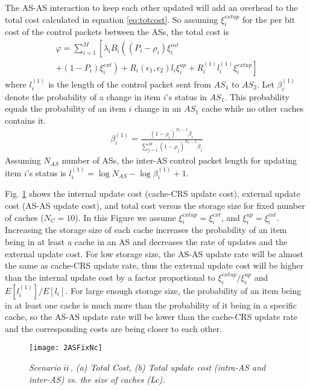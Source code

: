 \documentclass[conference]{IEEEtran}
\theoremstyle{plain}
\theoremstyle{remark}
\begin{document}
The AS-AS interaction to keep each other updated will add an overhead to the total cost calculated in equation \ref{eq:totcost}. So assuming $\xi^{extup}_i$ for the per bit cost of the control packets between the ASs, the total cost is
\begin{eqnarray}
&\varphi =\sum_{i=1}^M \left[ \lambda_i B_i \left((P_i-\rho_i) \xi^{int}_i \right. \right.& \nonumber\\ 
&+ \left. (1-P_i) \xi^{ext}_i\right) + R_i(\epsilon_1,\epsilon_2) l_i \xi^{up}_i + \left. R^{(1)}_i l^{(1)}_i \xi^{extup}_i \right]&
\end{eqnarray}
where $l^{(1)}_i$ is the length of the control packet sent from $AS_1$ to $AS_2$. Let $\beta^{(1)}_i$ denote the probability of a change in item $i$'s status in $AS_1$. This probability equals the probability of an item $i$ change in an $AS_1$ cache while no other caches contains it.
\begin{eqnarray}
\beta^{(1)}_i = \frac{(1-\rho_i)^{N_c-1}\beta_i}{\sum_{j=1}^M (1-\rho_j)^{N_c-1}\beta_j} \nonumber
\end{eqnarray}
Assuming $N_{AS}$ number of ASs, the inter-AS control packet length for updating item $i$'s status is $l^{(1)}_i = \log N_{AS}-\log \beta^{(1)}_i +1$.

Fig. \ref{fig:cost2ASvsLc} shows the internal update cost (cache-CRS update cost), external update cost (AS-AS update cost), and total cost versus the storage size for fixed number of caches ($N_C=10$). In this Figure we assume $\xi^{extup}_i=\xi^{ext}_i$, and $\xi^{up}_i=\xi^{int}_i$. Increasing the storage size of each cache increases the probability of an item being in at least a cache in an AS and decreases the rate of updates and the external update cost. For low storage size, the AS-AS update rate will be almost the same as cache-CRS update rate, thus the external update cost will be higher than the internal update cost by a factor proportional to $\xi^{extup}_i/\xi^{up}_i$ and $E[l^{(1)}_i]/E[l_i]$. For large enough storage size, the probability of an item being in at least one cache is much more than the probability of it being in a specific cache, so the AS-AS update rate will be lower than the cache-CRS update rate and the corresponding costs are being closer to each other.

\begin{figure}[http]
    \center
      \texttt{[image: 2ASFixNc]}\\
      \caption{\textit{Scenario $\romannumeral 2$, (a) Total Cost, (b) Total update cost (intra-AS and inter-AS) vs. the size of caches (Lc).}}
    \label{fig:cost2ASvsLc}
\end{figure}
\end{document}
